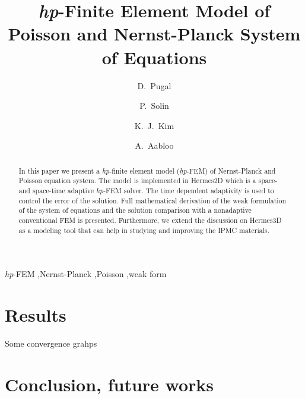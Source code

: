 \documentclass[letterpaper,3p]{elsarticle}
\begin{document}
\begin{frontmatter}

\title{\emph{hp}-Finite Element Model of Poisson and Nernst-Planck System of Equations}

\author[unrme,tartu]{D.~Pugal}

\author[unrmath,czech]{P.~Solin}

\author[unrme]{K.~J.~Kim}

\author[tartu]{A.~Aabloo}

\address[unrme]{Mechanical Engineering Department, University of Nevada, Reno, NV, U.S.A.}
\address[unrmath]{FEM group, Department of Mathematics and Statistics,\\
University of Nevada, Reno, NV, U.S.A.}
\address[czech]{Institute of Thermomechanics, Prague, Czech Republic}
\address[tartu]{Institute of Technology, Tartu University, Estonia}


\begin{abstract}
 In this paper we present a \emph{hp}-finite element
model (\emph{hp}-FEM) of Nernst-Planck and Poisson equation system.
The model is implemented in Hermes2D which is a
space- and space-time adaptive \emph{hp}-FEM solver. The time dependent
adaptivity is used to control the error of the solution. Full mathematical
derivation of the weak formulation of the system of equations and
the solution comparison with a nonadaptive conventional FEM is presented.
Furthermore, we extend the discussion on Hermes3D as a modeling tool that can
help in studying and improving the IPMC materials.
\end{abstract}

\begin{keyword}
  \emph{hp}-FEM \sep Nernst-Planck \sep Poisson \sep weak form
\end{keyword}

\end{frontmatter}




\section{Results}
Some convergence grahps

\section{Conclusion, future works}



\end{document}
